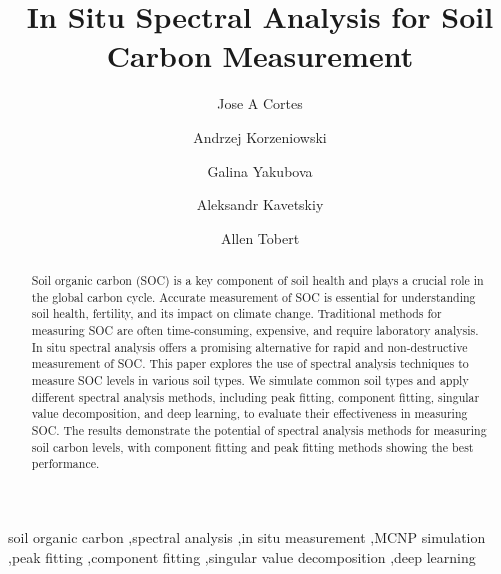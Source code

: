 \documentclass[review]{elsarticle}
\begin{document}
\begin{frontmatter}



\title{In Situ Spectral Analysis for Soil Carbon Measurement}


\author[uta]{Jose A Cortes}

\author[uta]{Andrzej Korzeniowski}

\author[usda]{Galina Yakubova}

\author[usda]{Aleksandr Kavetskiy}

\author[usda]{Allen Tobert}


\address[uta]{University of Texas at Arlington, Arlington TX, USA}
\address[usda]{USDA ARS Auburn Lab, Auburn AL, USA}

\begin{abstract}
Soil organic carbon (SOC) is a key component of soil health and plays a crucial role in the global carbon cycle. Accurate measurement of SOC is essential for understanding soil health, fertility, and its impact on climate change. Traditional methods for measuring SOC are often time-consuming, expensive, and require laboratory analysis. In situ spectral analysis offers a promising alternative for rapid and non-destructive measurement of SOC. This paper explores the use of spectral analysis techniques to measure SOC levels in various soil types. We simulate common soil types and apply different spectral analysis methods, including peak fitting, component fitting, singular value decomposition, and deep learning, to evaluate their effectiveness in measuring SOC. The results demonstrate the potential of spectral analysis methods for measuring soil carbon levels, with component fitting and peak fitting methods showing the best performance.
\end{abstract}

\begin{keyword}
soil organic carbon \sep spectral analysis \sep in situ measurement \sep MCNP simulation \sep peak fitting \sep component fitting \sep singular value decomposition \sep deep learning
\end{keyword}

\end{frontmatter}
\end{document}
